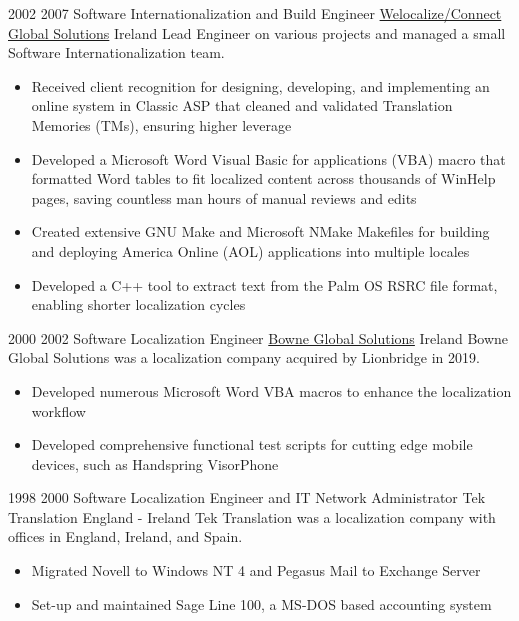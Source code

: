 \begin{twenty}
\twentyitem
  {2002}
  {2007}
  {Software Internationalization and Build Engineer}
  {\href{https://www.welocalize.com/}{Welocalize/Connect Global Solutions}}
  {Ireland}
  {Lead Engineer on various projects and managed a small Software Internationalization team.}
  {}
  {\begin{itemize}
    \item Received client recognition for designing, developing, and implementing an online system in Classic ASP that cleaned and validated Translation Memories (TMs), ensuring higher leverage
    \item Developed a Microsoft Word Visual Basic for applications (VBA) macro that formatted Word tables to fit localized content across thousands of WinHelp pages, saving countless man hours of manual reviews and edits
    \item Created extensive GNU Make and Microsoft NMake Makefiles for building and deploying America Online (AOL) applications into multiple locales
    \item Developed a C++ tool to extract text from the Palm OS RSRC file format, enabling shorter localization cycles
  \end{itemize}
  }
\end{twenty}

\begin{twenty}
\twentyitem
  {2000}
  {2002}
  {Software Localization Engineer}
  {\href{https://www.lionbridge.com/}{Bowne Global Solutions}}
  {Ireland}
  {Bowne Global Solutions was a localization company acquired by Lionbridge in 2019.}
  {}
  {\begin{itemize}
    \item Developed numerous Microsoft Word VBA macros to enhance the localization workflow
    \item Developed comprehensive functional test scripts for cutting edge mobile devices, such as Handspring VisorPhone
  \end{itemize}
  }
\end{twenty}

\begin{twenty}
\twentyitem
  {1998}
  {2000}
  {Software Localization Engineer and IT Network Administrator}
  {Tek Translation}
  {England - Ireland}
  {Tek Translation was a localization company with offices in England, Ireland, and Spain.}
  {}
  {\begin{itemize}
    \item Migrated Novell to Windows NT 4 and Pegasus Mail to Exchange Server
    \item Set-up and maintained Sage Line 100, a MS-DOS based accounting system
  \end{itemize}
  }
\end{twenty}
